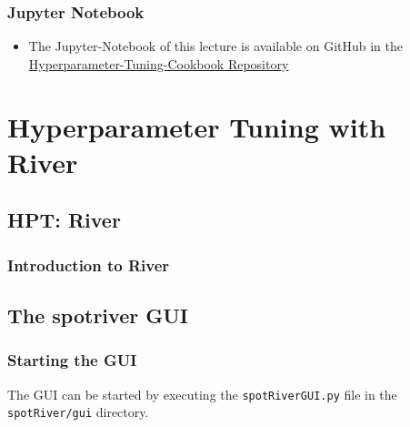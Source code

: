 \documentclass[
  letterpaper,
  DIV=11,
  numbers=noendperiod]{scrreprt}
\providecommand{\tightlist}{%
  \setlength{\itemsep}{0pt}\setlength{\parskip}{0pt}}\usepackage{longtable,booktabs,array}
\begin{document}
\section{Jupyter Notebook}\label{jupyter-notebook-10}

\begin{tcolorbox}[enhanced jigsaw, coltitle=black, bottomrule=.15mm, breakable, toprule=.15mm, colframe=quarto-callout-note-color-frame, title=\textcolor{quarto-callout-note-color}{\faInfo}\hspace{0.5em}{Note}, colbacktitle=quarto-callout-note-color!10!white, opacityback=0, left=2mm, leftrule=.75mm, colback=white, rightrule=.15mm, bottomtitle=1mm, toptitle=1mm, titlerule=0mm, arc=.35mm, opacitybacktitle=0.6]

\begin{itemize}
\tightlist
\item
  The Jupyter-Notebook of this lecture is available on GitHub in the
  \href{https://github.com/sequential-parameter-optimization/Hyperparameter-Tuning-Cookbook/blob/main/015_num_spot_correlation_p.ipynb}{Hyperparameter-Tuning-Cookbook
  Repository}
\end{itemize}

\end{tcolorbox}

\part{Hyperparameter Tuning with River}

\chapter{HPT: River}\label{sec-hpt-river}

\section{Introduction to River}\label{sec-hpt-river-intro}

\chapter{The spotriver GUI}\label{the-spotriver-gui}

\section{Starting the GUI}\label{starting-the-gui}

The GUI can be started by executing the \texttt{spotRiverGUI.py} file in
the \texttt{spotRiver/gui} directory.
\end{document}
